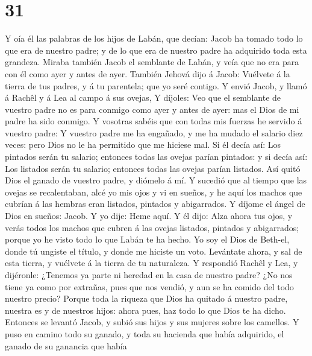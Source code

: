 \hypertarget{section-30}{%
\section{31}\label{section-30}}

 Y oía él las palabras de los hijos de Labán, que decían:
Jacob ha tomado todo lo que era de nuestro padre; y de lo que era de
nuestro padre ha adquirido toda esta grandeza.  Miraba
también Jacob el semblante de Labán, y veía que no era para con él como
ayer y antes de ayer.  También Jehová dijo á Jacob:
Vuélvete á la tierra de tus padres, y á tu parentela; que yo seré
contigo.  Y envió Jacob, y llamó á Rachêl y á Lea al campo
á sus ovejas,  Y díjoles: Veo que el semblante de vuestro
padre no es para conmigo como ayer y antes de ayer: mas el Dios de mi
padre ha sido conmigo.  Y vosotras sabéis que con todas
mis fuerzas he servido á vuestro padre:  Y vuestro padre
me ha engañado, y me ha mudado el salario diez veces: pero Dios no le ha
permitido que me hiciese mal.  Si él decía así: Los
pintados serán tu salario; entonces todas las ovejas parían pintados: y
si decía así: Los listados serán tu salario; entonces todas las ovejas
parían listados.  Así quitó Dios el ganado de vuestro
padre, y diómelo á mí.  Y sucedió que al tiempo que las
ovejas se recalentaban, alcé yo mis ojos y vi en sueños, y he aquí los
machos que cubrían á las hembras eran listados, pintados y abigarrados.
 Y díjome el ángel de Dios en sueños: Jacob. Y yo dije:
Heme aquí.  Y él dijo: Alza ahora tus ojos, y verás todos
los machos que cubren á las ovejas listados, pintados y abigarrados;
porque yo he visto todo lo que Labán te ha hecho.  Yo soy
el Dios de Beth-el, donde tú ungiste el título, y donde me hiciste un
voto. Levántate ahora, y sal de esta tierra, y vuélvete á la tierra de
tu naturaleza.  Y respondió Rachêl y Lea, y dijéronle:
¿Tenemos ya parte ni heredad en la casa de nuestro padre?
 ¿No nos tiene ya como por extrañas, pues que nos vendió,
y aun se ha comido del todo nuestro precio?  Porque toda
la riqueza que Dios ha quitado á nuestro padre, nuestra es y de nuestros
hijos: ahora pues, haz todo lo que Dios te ha dicho. 
Entonces se levantó Jacob, y subió sus hijos y sus mujeres sobre los
camellos.  Y puso en camino todo su ganado, y toda su
hacienda que había adquirido, el ganado de su ganancia que había

